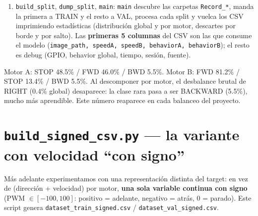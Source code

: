 \documentclass[11pt,a4paper]{article}
\newcommand{\code}[1]{\lstinline[basicstyle=\ttfamily\normalsize]|#1|}
\begin{document}
\begin{enumerate}
\begin{itemize}
    \item \textbf{Recorte de bordes}: descarta las imágenes anteriores al primer comando asociado y posteriores
    al último (el piloto dejaba el auto quieto largo rato antes y después; esos frames no son decisiones).
    \item \textbf{Filtro de latencia y segmentación}: si entre dos frames consecutivos hay un salto $>1000$ ms
    (\code{MAX_DELAY_MS}), descarta el frame de transición e incrementa un \code{chunk\_id}, cortando la serie
    en sub-sesiones \code{_seqN}. Esto evita ``teletransportes'' temporales y, además, le da al modelo
    secuencial fronteras limpias donde no cruzar.
    \item Para cada imagen del rango útil: si tiene comando, usa los valores reales (\code{source=real}); si no,
    interpola (\code{source=interp}). Re-aplica la regla de freno y, \textbf{al final}, decodifica
    \code{behaviorA}/\code{behaviorB} desde velocidad+GPIO ya procesados.
  \end{itemize}
  \item \code{build_split}, \code{dump_split}, \code{main}: \code{main} descubre las carpetas \code{Record_*},
  manda la primera a TRAIN y el resto a VAL, procesa cada split y vuelca los CSV imprimiendo estadísticas
  (distribución global y por motor, descartes por borde y por salto). Las \textbf{primeras 5 columnas} del CSV
  son las que consume el modelo (\code{image_path, speedA, speedB, behaviorA, behaviorB}); el resto es debug
  (GPIO, behavior global, tiempo, sesión, fuente).
\end{enumerate}

\begin{nota}
Motor A: STOP 48.5\% / FWD 46.0\% / BWD 5.5\%. \quad Motor B: FWD 81.2\% / STOP 13.4\% / BWD 5.5\%.
Al descomponer por motor, el desbalance brutal de RIGHT (0.4\% global) desaparece: la clase rara pasa a ser
BACKWARD (5.5\%), mucho más aprendible. Este número reaparece en cada balanceo del proyecto.
\end{nota}

\section{\texttt{build\_signed\_csv.py} --- la variante con velocidad ``con signo''}
Más adelante experimentamos con una representación distinta del target: en vez de (dirección + velocidad) por
motor, \textbf{una sola variable continua con signo} (PWM $\in[-100,100]$: positivo = adelante, negativo =
atrás, 0 = parado). Este script genera \code{dataset_train_signed.csv} / \code{dataset_val_signed.csv}.
\end{document}

